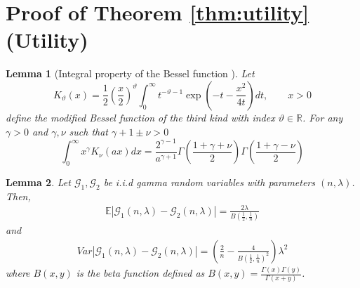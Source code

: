 \documentclass[11pt,a4paper]{article}
\theoremstyle{plain}
\theoremstyle{plain}
\theoremstyle{plain}
\theoremstyle{plain}
\newtheorem{lemma}{Lemma}
\theoremstyle{nonumberplain} \theoremseparator{}
\begin{document}



\newpage
\appendix
\section{Proof of Theorem \ref{thm:utility} (Utility)}
\label{app:proof}

\begin{lemma}[Integral property of the Bessel function \cite{kotz01book}]
\label{lem:bessel}
Let 
$$
K_{\vartheta}(x)  = \frac{1}{2} \left( \frac{x}{2} \right)^\vartheta \int_{0}^{\infty} t^{-\vartheta-1} \exp\left(
-t - \frac{x^2}{4t}\right)dt,\qquad x > 0  
$$
define the modified Bessel function of the third kind with index $\vartheta \in \mathbb{R}$.
For any $\gamma>0$ and $\gamma, \nu$ such that $\gamma + 1 \pm \nu > 0$
$$
\int_{0}^{\infty} x^{\gamma} K_{\nu}(ax)dx = \frac{2^{\gamma-1}}{a^{\gamma+1}} \Gamma\left(\frac{1+\gamma+\nu}{2}\right) \Gamma\left(\frac{1+\gamma-\nu}{2}\right)
$$
\end{lemma}

\begin{lemma}
\label{lem:abs}
Let $\mathcal{G}_{1}, \mathcal{G}_{2}$ be i.i.d gamma random variables with parameters $(n, \lambda)$. Then,
\begin{align}
\label{eq:exp}
\mathbb{E}|\mathcal{G}_{1}(n, \lambda) - \mathcal{G}_{2}(n, \lambda)| = \frac{2\lambda}{B\left(\frac{1}{2},\frac{1}{n}\right)} 
\end{align}
and
\begin{align}
\label{eq:var}
\mathit{Var}|\mathcal{G}_{1}(n, \lambda) - \mathcal{G}_{2}(n, \lambda)| = \left( \frac{2}{n} - \frac{4}{B\left(\frac{1}{2}, \frac{1}{n}\right)^2} \right) \lambda^2
\end{align}
where $B(x,y)$ is the beta function defined as $B(x,y) = \frac{\Gamma(x)\Gamma(y)}{\Gamma(x+y)}$.
\end{lemma}
\end{document}
